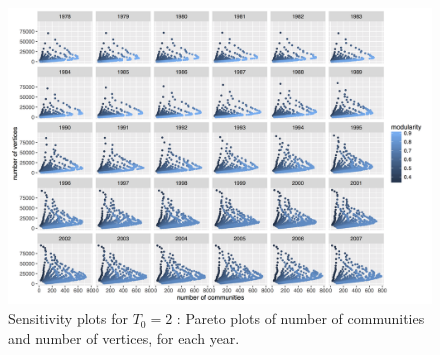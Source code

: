 \documentclass[12pt,twoside,a4paper]{article}
\begin{document}
\begin{figure}
\centering
\includegraphics[width=\textheight,height=\textwidth,angle=90]{vcount_comnum_pareto_window3.png}
\caption{Sensitivity plots for $T_0 = 2$ : Pareto plots of number of communities and number of vertices, for each year.}
\label{fig:sensitivity-window3-2}
\end{figure}
\end{document}
